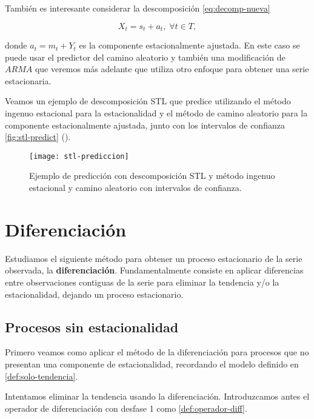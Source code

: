 También es interesante considerar la descomposición \eqref{eq:decomp-nueva}

\begin{equation}
  X_t = s_t + a_t, \; \forall t \in T,
  \label{eq:decomp-nueva}
\end{equation}

donde $a_t = m_t + Y_t$ es la componente estacionalmente ajustada. En este caso se puede usar el predictor del camino aleatorio y también una modificación de $ARMA$ que veremos más adelante que utiliza otro enfoque para obtener una serie estacionaria.

Veamos un ejemplo de descomposición STL que predice utilizando el método ingenuo estacional para la estacionalidad y el método de camino aleatorio para la componente estacionalmente ajustada, junto con los intervalos de confianza \autoref{fig:stl-predict} (\cite{hyndman2018forecasting}).

\begin{figure}[htpb]
  \centering
  \texttt{[image: stl-prediccion]}
  \caption{Ejemplo de predicción con descomposición STL y método ingenuo estacional y camino aleatorio con intervalos de confianza.}
  \label{fig:stl-predict}
\end{figure}

\section{Diferenciación}

Estudiamos el siguiente método para obtener un proceso estacionario de la serie observada, la \textbf{diferenciación}. Fundamentalmente consiste en aplicar diferencias entre observaciones contiguas de la serie para eliminar la tendencia y/o la estacionalidad, dejando un proceso estacionario.

\subsection{Procesos sin estacionalidad}

Primero veamos como aplicar el método de la diferenciación para procesos que no presentan una componente de estacionalidad, recordando el modelo definido en \autoref{def:solo-tendencia}.

Intentamos eliminar la tendencia usando la diferenciación. Introduzcamos antes  el operador de diferenciación con desfase 1 como \autoref{def:operador-diff}.


